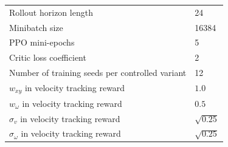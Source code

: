 \documentclass{article}
\begin{document}
\begin{table}[htbp]
\begin{tabular}{ll}
            Rollout horizon length & 24 \\
            Minibatch size & 16384 \\
            PPO mini-epochs & 5 \\
            Critic loss coefficient & 2 \\
            Number of training seeds per controlled variant & 12 \\
            \(w_{xy}\) in velocity tracking reward        & \(1.0\) \\
            \(w_{\omega}\)  in velocity tracking reward   & \(0.5\) \\
            \(\sigma_v\) in velocity tracking reward      & \(\sqrt{0.25}\) \\
            \(\sigma_\omega\) in velocity tracking reward & \(\sqrt{0.25}\) \\
            \bottomrule
        \end{tabular}
    \end{table}
    
\end{document}
